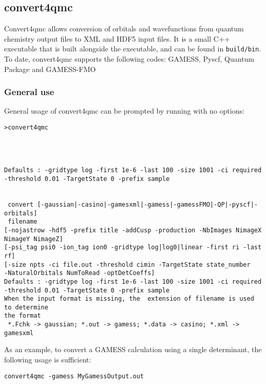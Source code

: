 \subsection{convert4qmc}
\label{sec:convert4qmc}
Convert4qmc allows conversion of orbitals and wavefunctions from
quantum chemistry output files to \qmcpack XML and HDF5 input files.
It is a small C++ executable that is built alongside the \qmcpack
executable, and can be found in \texttt{build/bin}.\\

To date, convert4qmc supports the following codes:
GAMESS\cite{schmidt93}, Pyscf\cite{Sun2018}, Quantum Package\cite{QP}
and GAMESS-FMO\cite{Fedorov2004,schmidt93}


\subsubsection{General use}
General usage of convert4qmc can be prompted by running with no options:

\begin{lstlisting}[style=SHELL]
>convert4qmc




Defaults : -gridtype log -first 1e-6 -last 100 -size 1001 -ci required -threshold 0.01 -TargetState 0 -prefix sample


 convert [-gaussian|-casino|-gamesxml|-gamess|-gamessFMO|-QP|-pyscf|-orbitals] 
 filename                                                          
[-nojastrow -hdf5 -prefix title -addCusp -production -NbImages NimageX NimageY NimageZ]
[-psi_tag psi0 -ion_tag ion0 -gridtype log|log0|linear -first ri -last rf]
[-size npts -ci file.out -threshold cimin -TargetState state_number
-NaturalOrbitals NumToRead -optDetCoeffs]                                        
Defaults : -gridtype log -first 1e-6 -last 100 -size 1001 -ci required 
-threshold 0.01 -TargetState 0 -prefix sample                                
When the input format is missing, the  extension of filename is used to determine
the format                                                      
 *.Fchk -> gaussian; *.out -> gamess; *.data -> casino; *.xml -> gamesxml
\end{lstlisting}


As an example, to convert a GAMESS calculation using a single determinant, the following usage is sufficient:\\
\begin{lstlisting}[style=SHELL]
convert4qmc -gamess MyGamessOutput.out
\end{lstlisting}

